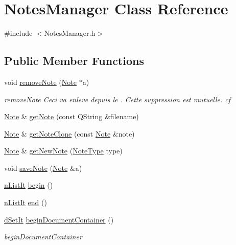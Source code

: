 \hypertarget{class_notes_manager}{\section{Notes\-Manager Class Reference}
\label{class_notes_manager}
}


{\ttfamily \#include $<$Notes\-Manager.\-h$>$}

\subsection*{Public Member Functions}
\begin{DoxyCompactItemize}
\item 
void \hyperlink{class_notes_manager_abb8b2f60468d389083efe4370af45708}{remove\-Note} (\hyperlink{class_note}{Note} $\ast$a)
\begin{DoxyCompactList}\small\item\em remove\-Note Ceci va enleve  depuis le . Cette suppression est mutuelle. cf  \end{DoxyCompactList}\item 
\hyperlink{class_note}{Note} \& \hyperlink{class_notes_manager_ae3cdea7be3b8deb08e6ecc995fd4d9fc}{get\-Note} (const Q\-String \&filename)
\item 
\hyperlink{class_note}{Note} \& \hyperlink{class_notes_manager_a31279a2483bb3d527fa5ca13e1dfb9e5}{get\-Note\-Clone} (const \hyperlink{class_note}{Note} \&note)
\item 
\hyperlink{class_note}{Note} \& \hyperlink{class_notes_manager_ae2156fb457d664a8f449d3c1f8594916}{get\-New\-Note} (\hyperlink{_note_factory_8h_a0e0de7dc7864c9c2e738e017dce974be}{Note\-Type} type)
\item 
void \hyperlink{class_notes_manager_a440078f6e2f8ee9c09c8e9f966803b6e}{save\-Note} (\hyperlink{class_note}{Note} \&a)
\item 
\hyperlink{_document_8h_adfa7415447032dfb0c19676b86692b8e}{n\-List\-It} \hyperlink{class_notes_manager_a5b3cdc21163d3668645f5a90ba45428d}{begin} ()
\item 
\hyperlink{_document_8h_adfa7415447032dfb0c19676b86692b8e}{n\-List\-It} \hyperlink{class_notes_manager_a27d6b2ed68cea9e4ca7ab9c670dc35ed}{end} ()
\item 
\hyperlink{_notes_manager_8h_a6979f3cb5cacc239c7b1683577be1eb6}{d\-Set\-It} \hyperlink{class_notes_manager_ab2bbb0bc84ce2493b274eaceec6c1092}{begin\-Document\-Container} ()
\begin{DoxyCompactList}\small\item\em begin\-Document\-Container \end{DoxyCompactList}\item 

\end{DoxyCompactItemize}
